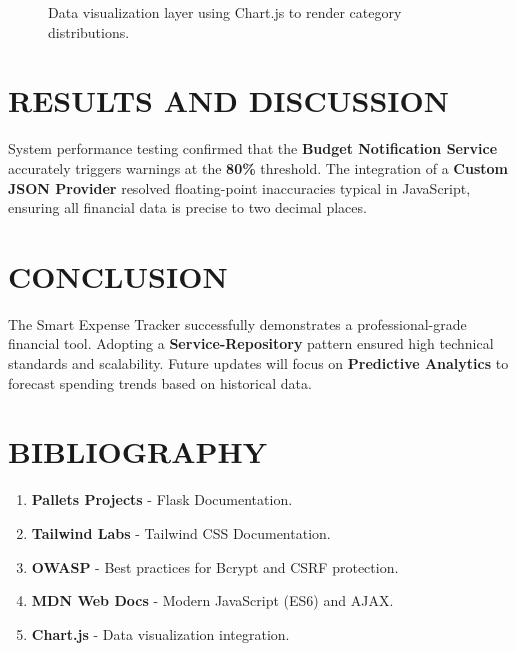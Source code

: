 \documentclass[12pt,a4paper]{article}
\begin{document}
\begin{figure}[H]
    \centering
    \caption{Data visualization layer using Chart.js to render category distributions.}
\end{figure}

\newpage

\section{RESULTS AND DISCUSSION}
System performance testing confirmed that the \textbf{Budget Notification Service} accurately triggers warnings at the \textbf{80\%} threshold. The integration of a \textbf{Custom JSON Provider} resolved floating-point inaccuracies typical in JavaScript, ensuring all financial data is precise to two decimal places.

\newpage

\section{CONCLUSION}
The Smart Expense Tracker successfully demonstrates a professional-grade financial tool. Adopting a \textbf{Service-Repository} pattern ensured high technical standards and scalability. Future updates will focus on \textbf{Predictive Analytics} to forecast spending trends based on historical data.

\newpage

\section*{BIBLIOGRAPHY}
\begin{enumerate}
    \item \textbf{Pallets Projects} - Flask Documentation.
    \item \textbf{Tailwind Labs} - Tailwind CSS Documentation.
    \item \textbf{OWASP} - Best practices for Bcrypt and CSRF protection.
    \item \textbf{MDN Web Docs} - Modern JavaScript (ES6) and AJAX.
    \item \textbf{Chart.js} - Data visualization integration.
\end{enumerate}
\end{document}
